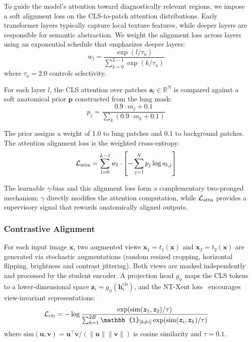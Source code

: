 To guide the model's attention toward diagnostically relevant regions, we impose a soft alignment loss on the CLS-to-patch attention distributions. Early transformer layers typically capture local texture features, while deeper layers are responsible for semantic abstraction. We weight the alignment loss across layers using an exponential schedule that emphasizes deeper layers:
\begin{equation}
w_l = \frac{\exp(l / \tau_a)}{\sum_{k=0}^{L-1} \exp(k / \tau_a)}
\label{eq:layer_weights}
\end{equation}
where $\tau_a = 2.0$ controls selectivity.

For each layer $l$, the CLS attention over patches $\bm{a}_l \in \mathbb{R}^{N}$ is compared against a soft anatomical prior $\bm{p}$ constructed from the lung mask:
\begin{equation}
p_j = \frac{0.9 \cdot m_j + 0.1}{\sum_{k} (0.9 \cdot m_k + 0.1)}
\label{eq:prior}
\end{equation}

The prior assigns a weight of 1.0 to lung patches and 0.1 to background patches. The attention alignment loss is the weighted cross-entropy:
\begin{equation}
\mathcal{L}_{\mathrm{attn}} = \sum_{l=0}^{L-1} w_l \cdot \left[ -\sum_{j=1}^{N} p_j \log a_{l,j} \right]
\label{eq:attn_loss}
\end{equation}

The learnable $\gamma$-bias and this alignment loss form a complementary two-pronged mechanism: $\gamma$ directly modifies the attention computation, while $\mathcal{L}_{\mathrm{attn}}$ provides a supervisory signal that rewards anatomically aligned outputs.

\subsubsection{Contrastive Alignment}
\label{sec:contrastive}

For each input image $\bm{x}$, two augmented views $\bm{x}_1 = t_1(\bm{x})$ and $\bm{x}_2 = t_2(\bm{x})$ are generated via stochastic augmentations (random resized cropping, horizontal flipping, brightness and contrast jittering). Both views are masked independently and processed by the student encoder. A projection head $g_\phi$ maps the CLS tokens to a lower-dimensional space $\bm{z}_i = g_\phi(\bm{h}^{\text{cls}}_i)$, and the NT-Xent loss~\cite{chen2020simclr} encourages view-invariant representations:
\begin{equation}
\Lctr = -\log \frac{\exp(\text{sim}(\bm{z}_1, \bm{z}_2) / \tau)}{\sum_{k=1}^{2B} \mathbb{1}_{[k \neq i]} \exp(\text{sim}(\bm{z}_i, \bm{z}_k) / \tau)}
\label{eq:ntxent}
\end{equation}
where $\text{sim}(\bm{u}, \bm{v}) = \bm{u}^\top \bm{v} / (\|\bm{u}\| \|\bm{v}\|)$ is cosine similarity and $\tau = 0.1$.

